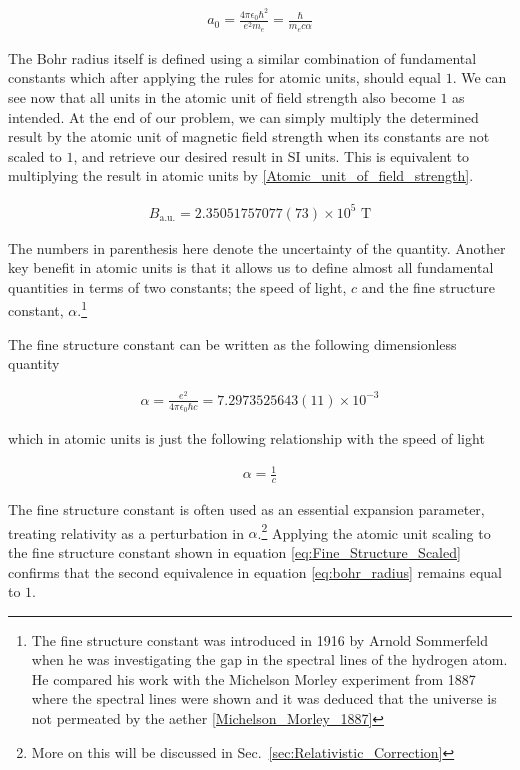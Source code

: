         \begin{align}
            a_0 = \frac{4\pi \epsilon_0 \hbar^2}{e^2 m_e} = \frac{\hbar}{m_e c \alpha} \label{eq:bohr_radius}
        \end{align}

        The Bohr radius itself is defined using a similar combination of fundamental constants which after applying the rules for atomic units, should equal $1$. We can see now that all units in the atomic unit of field strength also become $1$ as intended. At the end of our problem, we can simply multiply the determined result by the atomic unit of magnetic field strength when its constants are not scaled to $1$, and retrieve our desired result in SI units. This is equivalent to multiplying the result in atomic units by \ref{Atomic_unit_of_field_strength}.

        \begin{align}
            B_{\text{a.u.}} = 2.35051757077(73) \times 10^5 \text{ T}
        \end{align}

        The numbers in parenthesis here denote the uncertainty of the quantity. Another key benefit in atomic units is that it allows us to define almost all fundamental quantities in terms of two constants; the speed of light, $c$ and the fine structure constant, $\alpha$.\footnote{The fine structure constant was introduced in 1916 by Arnold Sommerfeld when he was investigating the gap in the spectral lines of the hydrogen atom. He compared his work with the Michelson Morley experiment from 1887 where the spectral lines were shown and it was deduced that the universe is not permeated by the aether \ref{Michelson_Morley_1887}}

        The fine structure constant can be written as the following dimensionless quantity

        \begin{align}
            \alpha = \frac{e^2}{4\pi \epsilon_0 \hbar c} = 7.2973525643(11) \times 10^{-3}   
        \end{align}

        \noindent which in atomic units is just the following relationship with the speed of light 

        \begin{align}
            \alpha = \frac{1}{c} \label{eq:Fine_Structure_Scaled}
        \end{align}

        \noindent The fine structure constant is often used as an essential expansion parameter, treating relativity as a perturbation in $\alpha$.\footnote{More on this will be discussed in Sec.~\ref{sec:Relativistic_Correction}} Applying the atomic unit scaling to the fine structure constant shown in equation \eqref{eq:Fine_Structure_Scaled} confirms that the second equivalence in equation \eqref{eq:bohr_radius} remains equal to $1$. 

